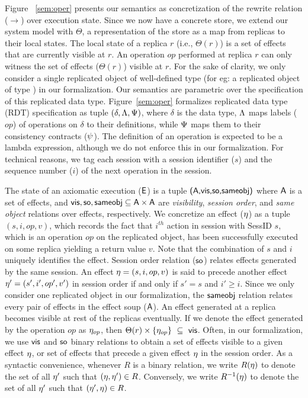 Figure ~\ref{sem:oper} presents our semantics as concretization of the
rewrite relation ($\xrightarrow{}$) over execution state. Since we now have a
concrete store, we extend our system model with $\Theta$, a representation of
the store as a map from replicas to their local states. The local state of a
replica $r$ (i.e., $\Theta(r)$) is a set of effects that are currently
visible at $r$.  An operation $op$ performed at replica $r$ can only witness
the set of effects ($\Theta(r)$) visible at $r$. For the sake of clarity, we
only consider a single replicated object of well-defined type (for eg: a
replicated object of type ) in our formalization.  Our
semantics are parametric over the specification of this replicated data type.
Figure~\ref{sem:oper} formalizes replicated data type (RDT) specification as
tuple $(\delta,\Lambda,\Psi)$, where $\delta$ is the data type, $\Lambda$ maps
labels ($op$) of operations on $\delta$ to their definitions, while $\Psi$
maps them to their consistency contracts ($\psi$). The definition of an
operation is expected to be a lambda expression, although we do not enforce
this in our formalization. For technical reasons, we tag each session with a
session identifier ($s$) and the sequence number ($i$) of the next operation
in the session. 

The state of an axiomatic execution (${\normalfont \textsf{E}}$) is a tuple ${\normalfont \textsf{({\normalfont \textsf{A}},\allowbreak {\normalfont \textsf{vis}},\allowbreak {\normalfont \textsf{so}},\allowbreak {\normalfont \textsf{sameobj}})}}$ where ${\normalfont \textsf{A}}$
is a set of effects, and ${\normalfont \textsf{vis}},{\normalfont \textsf{so}}, {\normalfont \textsf{sameobj}} \subseteq {\normalfont \textsf{A}} \times
{\normalfont \textsf{A}}$ are \emph{visibility}, \emph{session order}, and \emph{same object}
relations over effects, respectively. We concretize an effect ($\eta$) as a
tuple $(s,i,op,v)$, which records the fact that $i^{th}$ action in session
with {\sf SessID} $s$, which is an operation $op$ on the replicated object,
has been successfully executed on some replica yielding a return value $v$.
Note that the combination of $s$ and $i$ uniquely identifies the effect.
Session order relation (${\normalfont \textsf{so}}$) relates effects generated by the same session.
An effect $\eta = (s,i,op,v)$ is said to precede another effect $\eta' =
(s',i',op',v')$ in session order if and only if $s'=s$ and $i'\ge i$. Since we
only consider one replicated object in our formalization, the ${\normalfont \textsf{sameobj}}$
relation relates every pair of effects in the effect soup (${\normalfont \textsf{A}}$). An
effect generated at a replica becomes visible at rest of the replicas
eventually.  If we denote the effect generated by the operation $op$ as
$\eta_{op}$, then $\Theta(r) \times \{\eta_{op}\} ~\subseteq~ {\normalfont \textsf{vis}}$. Often,
in our formalization, we use ${\normalfont \textsf{vis}}$ and ${\normalfont \textsf{so}}$ binary relations to obtain a
set of effects visible to a given effect $\eta$, or set of effects that
precede a given effect $\eta$ in the session order. As a syntactic
convenience, whenever $R$ is a binary relation, we write $R(\eta)$ to denote
the set of all $\eta'$ such that $(\eta,\eta') \in R$.  Conversely, we write
$R^{-1}(\eta)$ to denote the set of all $\eta'$ such that $(\eta',\eta) \in
R$.  

